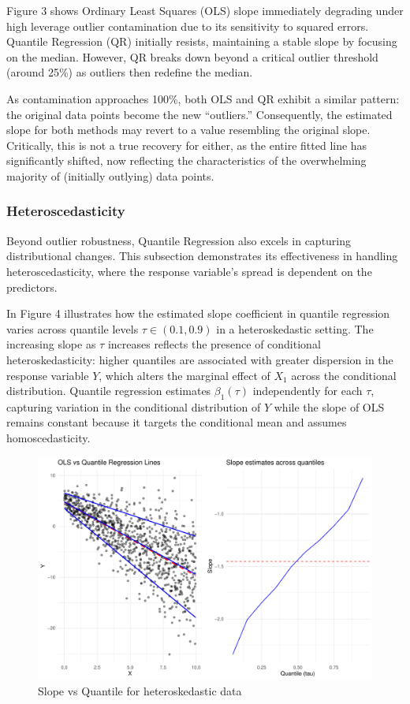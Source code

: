 \documentclass[fleqn,10pt]{latex/stylish_article} %
\begin{document}
Figure 3 shows Ordinary Least Squares (OLS) slope immediately degrading under high leverage outlier contamination due to its sensitivity to squared errors. Quantile Regression (QR) initially resists, maintaining a stable slope by focusing on the median. However, QR breaks down beyond a critical outlier threshold (around 25\%) as outliers then redefine the median.

As contamination approaches 100\%, both OLS and QR exhibit a similar pattern: the original data points become the new \enquote{outliers.} Consequently, the estimated slope for both methods may revert to a value resembling the original slope. Critically, this is not a true recovery for either, as the entire fitted line has significantly shifted, now reflecting the characteristics of the overwhelming majority of (initially outlying) data points.

\subsubsection{Heteroscedasticity}\label{heteroscedasticity}

Beyond outlier robustness, Quantile Regression also excels in capturing distributional changes. This subsection demonstrates its effectiveness in handling heteroscedasticity, where the response variable's spread is dependent on the predictors.

In Figure 4 illustrates how the estimated slope coefficient in quantile regression varies across quantile levels \(\tau \in (0.1, 0.9)\) in a heteroskedastic setting. The increasing slope as \(\tau\) increases reflects the presence of conditional heteroskedasticity: higher quantiles are associated with greater dispersion in the response variable \(Y\), which alters the marginal effect of \(X_1\) across the conditional distribution. Quantile regression estimates \(\beta_1(\tau)\) independently for each \(\tau\), capturing variation in the conditional distribution of \(Y\) while the slope of OLS remains constant because it targets the conditional mean and assumes homoscedasticity.

\begin{figure}[h]

{\centering \includegraphics[width=0.8\linewidth]{ADR_project_draft_files/figure-latex/unnamed-chunk-5-1} 

}

\caption{Slope vs Quantile for heteroskedastic data}\label{fig:unnamed-chunk-5}
\end{figure}
\end{document}

